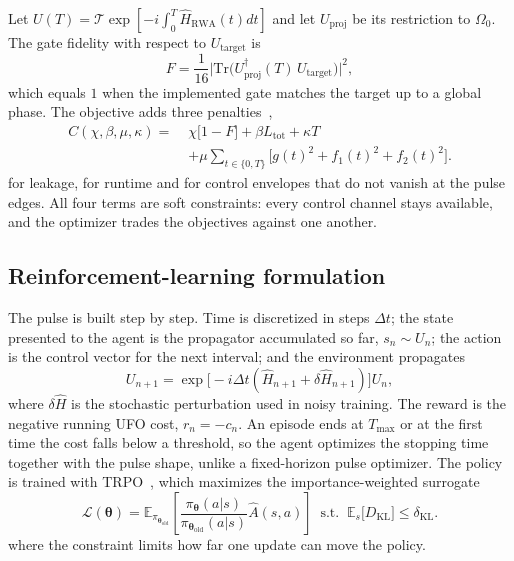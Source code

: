 \documentclass[aps,prx,twocolumn,superscriptaddress,nofootinbib,amsmath,amssymb,floatfix]{revtex4-2}
\newcommand{\Ltot}{L_{\mathrm{tot}}}
\newcommand{\Utgt}{U_{\mathrm{target}}}
\begin{document}
Let $U(T)=\mathcal{T}\exp[-i\int_0^T \hat H_{\mathrm{RWA}}(t)dt]$ and let $U_{\mathrm{proj}}$ be its
restriction to $\Omega_0$. The gate fidelity with respect to $\Utgt$ is
\begin{equation}
F=\frac{1}{16}\bigl|\mathrm{Tr}\bigl(U_{\mathrm{proj}}^{\dagger}(T)\,\Utgt\bigr)\bigr|^{2},
\label{eq:fidelity}
\end{equation}
which equals $1$ when the implemented gate matches the target up to a global phase. The objective adds
three penalties~\cite{Niu2019},
\begin{align}
C(\chi,\beta,\mu,\kappa)=\;&
\chi\bigl[1-F\bigr]+\beta \Ltot+\kappa T
\nonumber\\
&+\mu\!\!\sum_{t\in\{0,T\}}\!\!\bigl[g(t)^2+f_1(t)^2+f_2(t)^2\bigr].
\label{eq:ufo}
\end{align}
for leakage, for runtime and for control envelopes that do not vanish at the pulse edges. All four terms
are soft constraints: every control channel stays available, and the optimizer trades the objectives
against one another.

\subsection{Reinforcement-learning formulation}
\label{sec:rl}

The pulse is built step by step. Time is discretized in steps $\Delta t$; the state presented to the
agent is the propagator accumulated so far, $s_n\sim U_n$; the action is the control vector for the next
interval; and the environment propagates
\begin{equation}
U_{n+1}=\exp\!\bigl[-i\Delta t(\hat{H}_{n+1}+\delta\hat{H}_{n+1})\bigr]U_n ,
\label{eq:envstep}
\end{equation}
where $\delta\hat H$ is the stochastic perturbation used in noisy training. The reward is the negative
running UFO cost, $r_n=-c_n$. An episode ends at $T_{\max}$ or at the first time the cost falls below a
threshold, so the agent optimizes the stopping time together with the pulse shape, unlike a
fixed-horizon pulse optimizer. The policy is trained with TRPO~\cite{Schulman2015}, which maximizes the
importance-weighted surrogate
\begin{equation}
\mathcal{L}(\bm{\theta})=\mathbb{E}_{\pi_{\bm\theta_{\mathrm{old}}}}\!\left[
\frac{\pi_{\bm{\theta}}(a|s)}{\pi_{\bm{\theta}_{\mathrm{old}}}(a|s)}\hat{A}(s,a)\right]
\;\;\text{s.t.}\;\;
\mathbb{E}_s\bigl[D_{\mathrm{KL}}\bigr]\le\delta_{\mathrm{KL}} .
\label{eq:trpo}
\end{equation}
where the constraint limits how far one update can move the policy.
\end{document}
